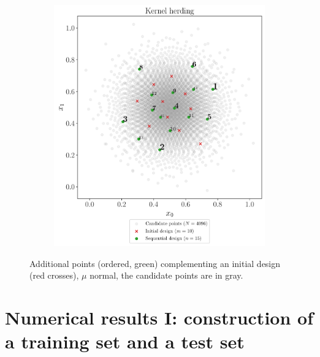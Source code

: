 \begin{figure}
\begin{subfigure}[b]{0.48\linewidth}
    \end{subfigure}
    \\
    \begin{subfigure}[b]{0.48\linewidth}
        \centering
        \includegraphics[width=\textwidth]{./part2/figures/SIS/normal2D_KH.pdf}
    \end{subfigure}
    \caption{Additional points (ordered, green) complementing an initial design (red crosses), $\mu$ normal, the candidate points are in gray. \\
    }
    \label{fig:normal_validation_designs}
\end{figure}     









\section{Numerical results I: construction of a training set and a test set}

